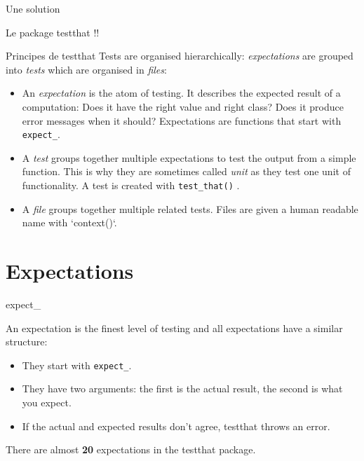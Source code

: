 \documentclass[12pt,handout]{beamer}
\begin{document}
\begin{frame}[fragile]

Une solution

\LARGE Le package testthat !!

\end{frame}




\begin{frame}[fragile]{Principes de testthat}
Tests are organised hierarchically: \textit{expectations} are grouped into \textit{tests} which are organised in \textit{files}:

\begin{itemize}
\item An \textit{expectation} is the atom of testing. It describes the expected result 
  of a computation: Does it have the right value and right class? Does it 
  produce error messages when it should? Expectations are functions that start 
  with \texttt{expect\_}.

\item A \textit{test} groups together multiple expectations to test the output
  from a simple function. This is why they are sometimes called \textit{unit}
  as they test one unit of functionality. A test is created with \texttt{test\_that()} .

\item A \textit{file} groups together multiple related tests. Files are given a human 
  readable name with `context()`.

\end{itemize}


\end{frame}

\section{Expectations}

\begin{frame}[fragile]{expect\_}

An expectation is the finest level of testing and all expectations have a similar structure:

\begin{itemize}
\item They start with \texttt{expect\_}.

\item They have two arguments: the first is the actual result, the second is what 
  you expect.
  
\item If the actual and expected results don't agree, testthat throws an error.

\end{itemize}
There are almost \textbf{20} expectations in the testthat package.

\end{frame}
\end{document}
